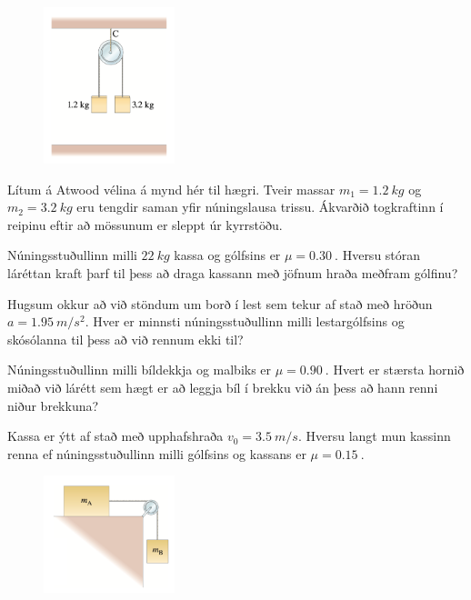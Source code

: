 \begin{enumerate}[label = \textbf{Dæmi \thechapter.\arabic*.}]
\begin{minipage}{\linewidth}
\end{minipage}

\vspace{0.3cm}

\begin{minipage}{\linewidth}
\begin{figure}
\vspace{-3.5cm}
\includegraphics[width=1.5in]{images/atwood.png}
\end{figure}

\item Lítum á Atwood vélina á mynd hér til hægri. Tveir massar $m_1 = \SI{1.2}{kg}$ og $m_2 = \SI{3.2}{kg}$ eru tengdir saman yfir núningslausa trissu. Ákvarðið togkraftinn í reipinu eftir að mössunum er sleppt úr kyrrstöðu.

\item Núningsstuðullinn milli $\SI{22}{kg}$ kassa og gólfsins er $\mu = \SI{0.30}{}$. Hversu stóran láréttan kraft þarf til þess að draga kassann með jöfnum hraða meðfram gólfinu?

\end{minipage}

\item Hugsum okkur að við stöndum um borð í lest sem tekur af stað með hröðun $a = \SI{1.95}{m/s^2}$. Hver er minnsti núningsstuðullinn milli lestargólfsins og skósólanna til þess að við rennum ekki til?

\item Núningsstuðullinn milli bíldekkja og malbiks er $\mu = \SI{0.90}{}$. Hvert er stærsta hornið miðað við lárétt sem hægt er að leggja bíl í brekku við án þess að hann renni niður brekkuna?

\item Kassa er ýtt af stað með upphafshraða $v_0 = \SI{3.5}{m/s}$. Hversu langt mun kassinn renna ef núningsstuðullinn milli gólfsins og kassans er $\mu = \SI{0.15}{}$.

\begin{minipage}{\linewidth}
\begin{figure}
\vspace{-0.75cm}
\includegraphics[width=1.5in]{images/trissbert.png}
\end{figure}


\end{minipage}
\end{enumerate}
